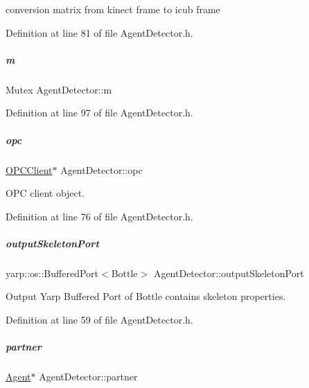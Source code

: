 conversion matrix from kinect frame to icub frame 



Definition at line 81 of file Agent\+Detector.\+h.

\mbox{\label{group__agentDetector_acafd08537c8ad4ace4fd067eb473cc99}} 
\subparagraph{\texorpdfstring{m}{m}}
{\footnotesize\ttfamily Mutex Agent\+Detector\+::m\hspace{0.3cm}{\ttfamily [protected]}}



Definition at line 97 of file Agent\+Detector.\+h.

\mbox{\label{group__agentDetector_aa2eace7b8603a72863384e33de3da699}} 
\subparagraph{\texorpdfstring{opc}{opc}}
{\footnotesize\ttfamily \hyperlink{group__icubclient__clients_classicubclient_1_1OPCClient}{O\+P\+C\+Client}$\ast$ Agent\+Detector\+::opc\hspace{0.3cm}{\ttfamily [protected]}}



O\+PC client object. 



Definition at line 76 of file Agent\+Detector.\+h.

\mbox{\label{group__agentDetector_aae49558e62e43aae0158f9bbd8fd49fe}} 
\subparagraph{\texorpdfstring{output\+Skeleton\+Port}{outputSkeletonPort}}
{\footnotesize\ttfamily yarp\+::os\+::\+Buffered\+Port$<$Bottle$>$ Agent\+Detector\+::output\+Skeleton\+Port\hspace{0.3cm}{\ttfamily [protected]}}



Output Yarp Buffered Port of Bottle contains skeleton properties. 



Definition at line 59 of file Agent\+Detector.\+h.

\mbox{\label{group__agentDetector_a38a81af762b23e270a34dd75ea95e0cd}} 
\subparagraph{\texorpdfstring{partner}{partner}}
{\footnotesize\ttfamily \hyperlink{group__icubclient__representations_classicubclient_1_1Agent}{Agent}$\ast$ Agent\+Detector\+::partner\hspace{0.3cm}{\ttfamily [protected]}}



